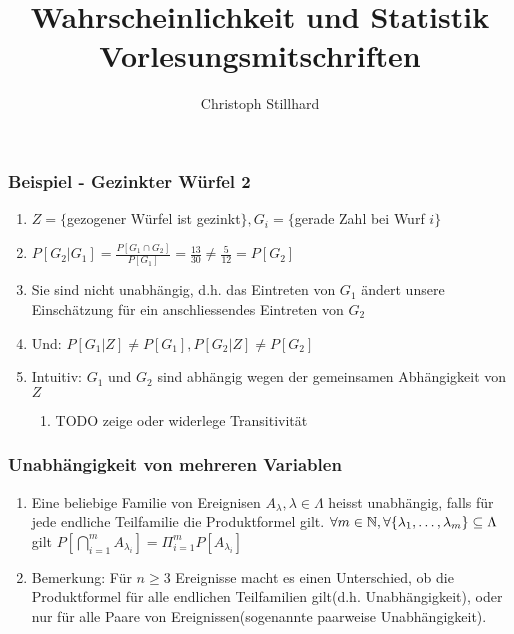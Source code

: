 \documentclass[10pt]{article}
\title{\textbf{Wahrscheinlichkeit und Statistik Vorlesungsmitschriften}}
\author{Christoph Stillhard}
\date{}
\newcommand{\enumstart}{\begin{enumerate}}
\newcommand{\enumend}{\end{enumerate}}
\newcommand{\N}{\mathbb{N}}
\begin{document}
\maketitle
{}
\thispagestyle{empty}

\let\stdsection\section
\renewcommand\section{\newpage\stdsection}

\newpage
{}
\setcounter{page}{1}
\tableofcontents

\newpage
{}
\setcounter{page}{1}






\subsubsection{Beispiel - Gezinkter Würfel 2}
\enumstart
	\item $Z = \{$gezogener Würfel ist gezinkt$\}, G_i = \{$gerade Zahl bei Wurf $i\}$
	\item $P[G_2 | G_1] = \frac{P[G_1 \cap G_2]}{P[G_1]} = \frac{13}{30} \ne \frac{5}{12} = P[G_2]$
	\item Sie sind nicht unabhängig, d.h. das Eintreten von $G_1$ ändert unsere Einschätzung für ein anschliessendes Eintreten von $G_2$
	\item Und: $P[G_1 | Z] \ne P[G_1], P[G_2 | Z] \ne P[G_2]$
	\item Intuitiv: $G_1$ und $G_2$ sind abhängig wegen der gemeinsamen Abhängigkeit von $Z$
	\enumstart
		\item TODO zeige oder widerlege Transitivität
	\enumend
\enumend

\subsubsection{Unabhängigkeit von mehreren Variablen}
\enumstart
	\item Eine beliebige Familie von Ereignisen $A_\lambda, \lambda \in \Lambda$ heisst unabhängig, falls für jede endliche Teilfamilie die Produktformel gilt. $\forall m \in \N, \forall \{\lambda_1, \mathellipsis, \lambda_m\} \subseteq \Lambda$ gilt $P[\bigcap^m_{i=1}A_{\lambda_i}] = \Pi^m_{i=1}P[A_{\lambda_i}]$
	\item Bemerkung: Für $n \ge 3$ Ereignisse macht es einen Unterschied, ob die Produktformel für alle endlichen Teilfamilien gilt(d.h. Unabhängigkeit), oder nur für alle Paare von Ereignissen(sogenannte paarweise Unabhängigkeit).
\enumend
\end{document}
